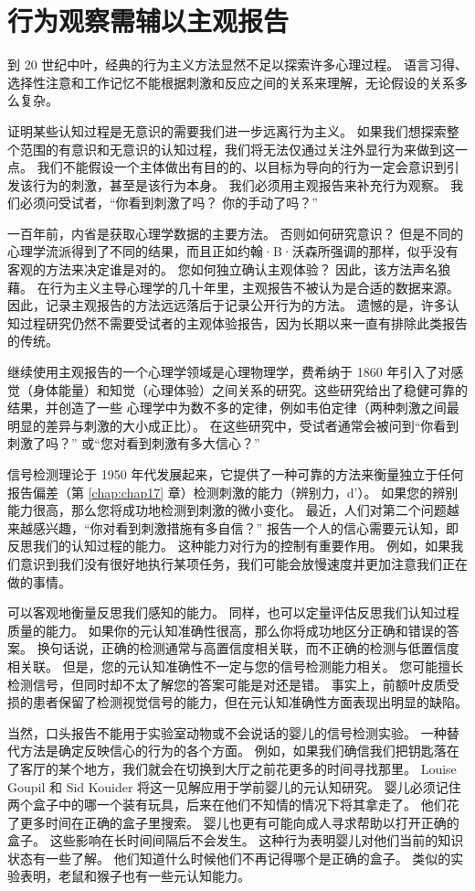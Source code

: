 \section{行为观察需辅以主观报告}
到 20 世纪中叶，经典的行为主义方法显然不足以探索许多心理过程。 语言习得、选择性注意和工作记忆不能根据刺激和反应之间的关系来理解，无论假设的关系多么复杂。

证明某些认知过程是无意识的需要我们进一步远离行为主义。 如果我们想探索整个范围的有意识和无意识的认知过程，我们将无法仅通过关注外显行为来做到这一点。 我们不能假设一个主体做出有目的的、以目标为导向的行为一定会意识到引发该行为的刺激，甚至是该行为本身。 我们必须用主观报告来补充行为观察。 我们必须问受试者，“你看到刺激了吗？ 你的手动了吗？”

一百年前，内省是获取心理学数据的主要方法。 否则如何研究意识？ 但是不同的心理学流派得到了不同的结果，而且正如约翰·B·沃森所强调的那样，似乎没有客观的方法来决定谁是对的。 您如何独立确认主观体验？ 因此，该方法声名狼藉。 在行为主义主导心理学的几十年里，主观报告不被认为是合适的数据来源。 因此，记录主观报告的方法远远落后于记录公开行为的方法。 遗憾的是，许多认知过程研究仍然不需要受试者的主观体验报告，因为长期以来一直有排除此类报告的传统。

继续使用主观报告的一个心理学领域是心理物理学，费希纳于 1860 年引入了对感觉（身体能量）和知觉（心理体验）之间关系的研究。这些研究给出了稳健可靠的结果，并创造了一些 心理学中为数不多的定律，例如韦伯定律（两种刺激之间最明显的差异与刺激的大小成正比）。 在这些研究中，受试者通常会被问到“你看到刺激了吗？” 或“您对看到刺激有多大信心？”

信号检测理论于 1950 年代发展起来，它提供了一种可靠的方法来衡量独立于任何报告偏差（第 \ref{chap:chap17} 章）检测刺激的能力（辨别力，d'）。 如果您的辨别能力很高，那么您将成功地检测到刺激的微小变化。 最近，人们对第二个问题越来越感兴趣，“你对看到刺激措施有多自信？” 报告一个人的信心需要元认知，即反思我们的认知过程的能力。 这种能力对行为的控制有重要作用。 例如，如果我们意识到我们没有很好地执行某项任务，我们可能会放慢速度并更加注意我们正在做的事情。

可以客观地衡量反思我们感知的能力。 同样，也可以定量评估反思我们认知过程质量的能力。 如果你的元认知准确性很高，那么你将成功地区分正确和错误的答案。 换句话说，正确的检测通常与高置信度相关联，而不正确的检测与低置信度相关联。 但是，您的元认知准确性不一定与您的信号检测能力相关。 您可能擅长检测信号，但同时却不太了解您的答案可能是对还是错。 事实上，前额叶皮质受损的患者保留了检测视觉信号的能力，但在元认知准确性方面表现出明显的缺陷。

当然，口头报告不能用于实验室动物或不会说话的婴儿的信号检测实验。 一种替代方法是确定反映信心的行为的各个方面。 例如，如果我们确信我们把钥匙落在了客厅的某个地方，我们就会在切换到大厅之前花更多的时间寻找那里。 Louise Goupil 和 Sid Kouider 将这一见解应用于学前婴儿的元认知研究。 婴儿必须记住两个盒子中的哪一个装有玩具，后来在他们不知情的情况下将其拿走了。 他们花了更多时间在正确的盒子里搜索。 婴儿也更有可能向成人寻求帮助以打开正确的盒子。 这些影响在长时间间隔后不会发生。 这种行为表明婴儿对他们当前的知识状态有一些了解。 他们知道什么时候他们不再记得哪个是正确的盒子。 类似的实验表明，老鼠和猴子也有一些元认知能力。

